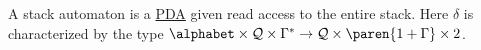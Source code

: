 A stack automaton is a \hyperref[sec:zoo-str/pda]{PDA} given read access to
the entire stack.  Here $\delta$ is characterized by the type $\alphabet
\times \mathcal{Q} \times \Gamma^* \to \mathcal{Q} \times \paren{1 + \Gamma}
\times 2$.

